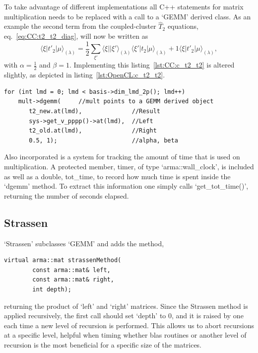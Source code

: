 To take advantage of different implementations all C++ statements for matrix multiplication needs to be replaced with a call to a `GEMM' derived class.
As an example the second term from the coupled-cluster $\hat{T}_2$ equations, eq.~\ref{eq:CC:t2_t2_diag}, will now be written as 
\begin{equation}
\langle \xi | t'_2 | \mu \rangle_{(\lambda)} = \frac{1}{2} \sum_{\xi'} \langle \xi || \xi' \rangle_{(\lambda)} \langle \xi' |t_2| \mu \rangle_{(\lambda)} + 1 \langle \xi | t'_2 | \mu \rangle_{(\lambda)},
\end{equation}
with $\alpha = \frac{1}{2}$ and $\beta = 1$.
Implementing this listing~\ref{lst:CC:c_t2_t2} is altered slightly, as depicted in listing~\ref{lst:OpenCL:c_t2_t2}.
\begin{lstlisting}[float,label={lst:OpenCL:c_t2_t2},caption={Second term of the coupled-cluster $\hat{T}_2$ equations, now using the matrix-multiplication framework in `GEMM'.}]
for (int lmd = 0; lmd < basis->dim_lmd_2p(); lmd++)
    mult->dgemm(     //mult points to a GEMM derived object
       t2_new.at(lmd),              //Result
       sys->get_v_pppp()->at(lmd),  //Left
       t2_old.at(lmd),              //Right
       0.5, 1);                     //alpha, beta
\end{lstlisting}

Also incorporated is a system for tracking the amount of time that is used on multiplication.
A protected member, timer, of type `arma::wall\_clock', is included as well as a double, tot\_time, to record how much time is spent inside the `dgemm' method.
To extract this information one simply calls `get\_tot\_time()', returning the number of seconds elapsed.


\subsection{Strassen}
`Strassen' subclasses `GEMM' and adds the method,
\begin{lstlisting}
virtual arma::mat strassenMethod(
		const arma::mat& left,
		const arma::mat& right,
		int depth);
\end{lstlisting}
returning the product of `left' and `right' matrices.
Since the Strassen method is applied recursively, the first call should set `depth' to $0$, and it is raised by one each time a new level of recursion is performed.
This allows us to abort recursions at a specific level, helpful when timing whether blas routines or another level of recursion is the most beneficial for a specific size of the matrices.

